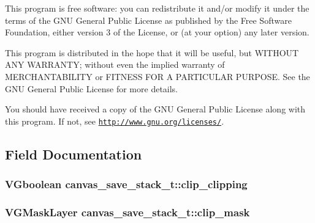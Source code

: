 This program is free software\+: you can redistribute it and/or modify it under the terms of the G\+N\+U General Public License as published by the Free Software Foundation, either version 3 of the License, or (at your option) any later version.

This program is distributed in the hope that it will be useful, but W\+I\+T\+H\+O\+U\+T A\+N\+Y W\+A\+R\+R\+A\+N\+T\+Y; without even the implied warranty of M\+E\+R\+C\+H\+A\+N\+T\+A\+B\+I\+L\+I\+T\+Y or F\+I\+T\+N\+E\+S\+S F\+O\+R A P\+A\+R\+T\+I\+C\+U\+L\+A\+R P\+U\+R\+P\+O\+S\+E. See the G\+N\+U General Public License for more details.

You should have received a copy of the G\+N\+U General Public License along with this program. If not, see \href{http://www.gnu.org/licenses/}{\tt http\+://www.\+gnu.\+org/licenses/}. 

\subsection{Field Documentation}
\hypertarget{structcanvas__save__stack__t_a2c6afadff95edda2b6919484ece09bfd}{}
\subsubsection[{clip\+\_\+clipping}]{\setlength{\rightskip}{0pt plus 5cm}V\+Gboolean canvas\+\_\+save\+\_\+stack\+\_\+t\+::clip\+\_\+clipping}\label{structcanvas__save__stack__t_a2c6afadff95edda2b6919484ece09bfd}
\hypertarget{structcanvas__save__stack__t_abf0557dc1ac91549a277047c460f577c}{}
\subsubsection[{clip\+\_\+mask}]{\setlength{\rightskip}{0pt plus 5cm}V\+G\+Mask\+Layer canvas\+\_\+save\+\_\+stack\+\_\+t\+::clip\+\_\+mask}\label{structcanvas__save__stack__t_abf0557dc1ac91549a277047c460f577c}
\hypertarget{structcanvas__save__stack__t_afe0bfcfcd94ff8e3961bc6fed3789352}{}
